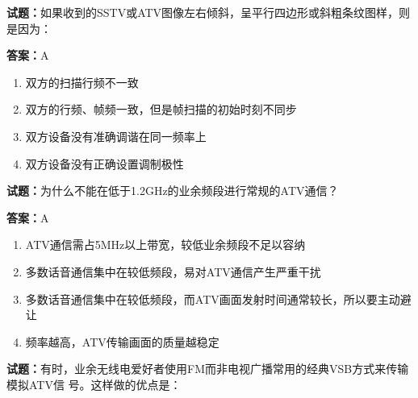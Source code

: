 \documentclass{ctexbook}
\begin{document}




\vspace{1em}

\textbf{试题：}如果收到的SSTV或ATV图像左右倾斜，呈平行四边形或斜粗条纹图样，则是因为： 

\textbf{答案：}A 

\begin{enumerate}[leftmargin=3em]
  \item 双方的扫描行频不一致 

  \item 双方的行频、帧频一致，但是帧扫描的初始时刻不同步 

  \item 双方设备没有准确调谐在同一频率上 

  \item 双方设备没有正确设置调制极性 

\end{enumerate}





\vspace{1em}

\textbf{试题：}为什么不能在低于1.2GHz的业余频段进行常规的ATV通信？ 

\textbf{答案：}A 

\begin{enumerate}[leftmargin=3em]
  \item ATV通信需占5MHz以上带宽，较低业余频段不足以容纳 

  \item 多数话音通信集中在较低频段，易对ATV通信产生严重干扰 

  \item 多数话音通信集中在较低频段，而ATV画面发射时间通常较长，所以要主动避让 

  \item 频率越高，ATV传输画面的质量越稳定 

\end{enumerate}





\vspace{1em}

\textbf{试题：}有时，业余无线电爱好者使用FM而非电视广播常用的经典VSB方式来传输模拟ATV信
号。这样做的优点是： 
\end{document}
